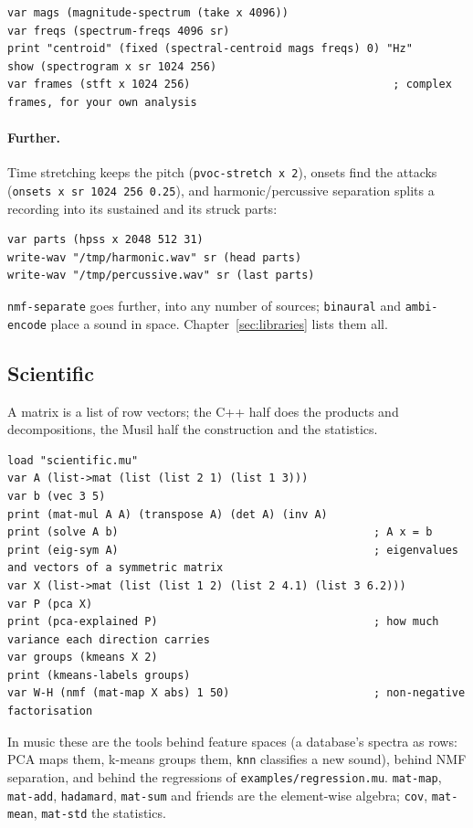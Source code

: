 \documentclass[11pt,a4paper]{article}
\newcommand{\musil}[1]{\lstinline[style=musilinline]{#1}}
\begin{document}
\begin{lstlisting}
var mags (magnitude-spectrum (take x 4096))
var freqs (spectrum-freqs 4096 sr)
print "centroid" (fixed (spectral-centroid mags freqs) 0) "Hz"
show (spectrogram x sr 1024 256)
var frames (stft x 1024 256)                               ; complex frames, for your own analysis
\end{lstlisting}

\paragraph{Further.} Time stretching keeps the pitch (\musil{pvoc-stretch x 2}), onsets
find the attacks (\musil{onsets x sr 1024 256 0.25}), and harmonic/percussive separation
splits a recording into its sustained and its struck parts:

\begin{lstlisting}
var parts (hpss x 2048 512 31)
write-wav "/tmp/harmonic.wav" sr (head parts)
write-wav "/tmp/percussive.wav" sr (last parts)
\end{lstlisting}

\musil{nmf-separate} goes further, into any number of sources; \musil{binaural} and
\musil{ambi-encode} place a sound in space. Chapter~\ref{sec:libraries} lists them all.

\subsection{Scientific}

A matrix is a list of row vectors; the C++ half does the products and decompositions, the
Musil half the construction and the statistics.

\begin{lstlisting}
load "scientific.mu"
var A (list->mat (list (list 2 1) (list 1 3)))
var b (vec 3 5)
print (mat-mul A A) (transpose A) (det A) (inv A)
print (solve A b)                                       ; A x = b
print (eig-sym A)                                       ; eigenvalues and vectors of a symmetric matrix
var X (list->mat (list (list 1 2) (list 2 4.1) (list 3 6.2)))
var P (pca X)
print (pca-explained P)                                 ; how much variance each direction carries
var groups (kmeans X 2)
print (kmeans-labels groups)
var W-H (nmf (mat-map X abs) 1 50)                      ; non-negative factorisation
\end{lstlisting}

In music these are the tools behind feature spaces (a database's spectra as rows: PCA maps
them, k-means groups them, \musil{knn} classifies a new sound), behind NMF separation, and
behind the regressions of \texttt{examples/regression.mu}. \musil{mat-map},
\musil{mat-add}, \musil{hadamard}, \musil{mat-sum} and friends are the element-wise
algebra; \musil{cov}, \musil{mat-mean}, \musil{mat-std} the statistics.
\end{document}

